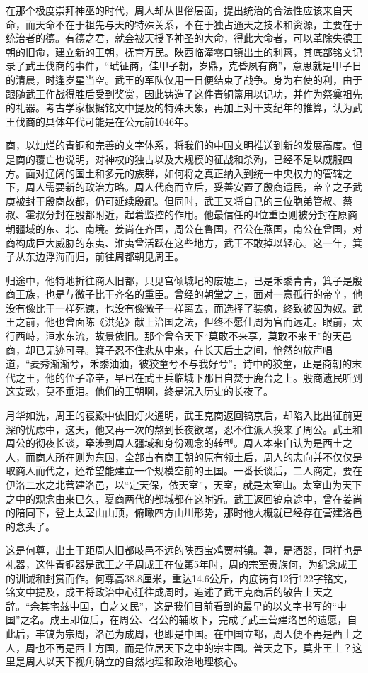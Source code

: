 在那个极度崇拜神巫的时代，周人却从世俗层面，提出统治的合法性应该来自天命，而天命不在于祖先与天的特殊关系，不在于独占通天之技术和资源，主要在于统治者的德。有德之君，就会被天授予神圣的大命，得此大命者，可以革除失德王朝的旧命，建立新的王朝，抚育万民。陕西临潼零口镇出土的利簋，其底部铭文记录了武王伐商的事件，“珷征商，佳甲子朝，岁鼎，克昏夙有商”，意思就是甲子日的清晨，时逢岁星当空。武王的军队仅用一日便结束了战争。身为右使的利，由于跟随武王作战得胜后受到奖赏，因此铸造了这件青铜簋用以记功，并作为祭奠祖先的礼器。考古学家根据铭文中提及的特殊天象，再加上对干支纪年的推算，认为武王伐商的具体年代可能是在公元前1046年。

商，以灿烂的青铜和完善的文字体系，将我们的中国文明推送到新的发展高度。但是商的覆亡也说明，对神权的独占以及大规模的征战和杀殉，已经不足以威服四方。面对辽阔的国土和多元的族群，如何将之真正纳入到统一中央权力的管辖之下，周人需要新的政治方略。周人代商而立后，妥善安置了殷商遗民，帝辛之子武庚被封于殷商故都，仍可延续殷祀。但同时，武王又将自己的三位胞弟管叔、蔡叔、霍叔分封在殷都附近，起着监控的作用。他最信任的4位重臣则被分封在原商朝疆域的东、北、南境。姜尚在齐国，周公在鲁国，召公在燕国，南公在曾国，对商构成巨大威胁的东夷、淮夷曾活跃在这些地方，武王不敢掉以轻心。这一年，箕子从东边浮海而归，前往周都朝见周王。

归途中，他特地折往商人旧都，只见宫倾城圮的废墟上，已是禾黍青青，箕子是殷商王族，也是与微子比干齐名的重臣。曾经的朝堂之上，面对一意孤行的帝辛，他没有像比干一样死谏，也没有像微子一样离去，而选择了装疯，终致被囚为奴。武王之前，他也曾面陈《洪范》献上治国之法，但终不愿仕周为官而远走。眼前，太行西峙，洹水东流，故景依旧。那个曾令天下“莫敢不来享，莫敢不来王”的天邑商，却已无迹可寻。箕子忍不住悲从中来，在长天后土之间，怆然的放声唱道，“麦秀渐渐兮，禾黍油油，彼狡童兮不与我好兮”。诗中的狡童，正是商朝的末代之王，他的侄子帝辛，早已在武王兵临城下那日自焚于鹿台之上。殷商遗民听到这支歌，莫不垂泪。他们的王朝啊，终是沉入历史的长夜了。

月华如洗，周王的寝殿中依旧灯火通明，武王克商返回镐京后，却陷入比出征前更深的忧虑中，这天，他又再一次的熬到长夜欲曙，忍不住派人换来了周公。武王和周公的彻夜长谈，牵涉到周人疆域和身份观念的转型。周人本来自认为是西土之人，而商人所在则为东国，全部占有商王朝的原有领土后，周人的志向并不仅仅是取商人而代之，还希望能建立一个规模空前的王国。一番长谈后，二人商定，要在伊洛二水之北营建洛邑，以“定天保，依天室”，天室，就是太室山。太室山为天下之中的观念由来已久，夏商两代的都城都在这附近。武王返回镐京途中，曾在姜尚的陪同下，登上太室山山顶，俯瞰四方山川形势，那时他大概就已经存在营建洛邑的念头了。

这是何尊，出土于距周人旧都岐邑不远的陕西宝鸡贾村镇。尊，是酒器，同样也是礼器，这件青铜器是武王之子周成王在位第5年时，周的宗室贵族何，为纪念成王的训诫和封赏而作。何尊高38.8厘米，重达14.6公斤，内底铸有12行122字铭文，铭文中提及，成王将政治中心迁往成周时，追述了武王克商后的敬告上天之辞。“余其宅兹中国，自之乂民”，这是我们目前看到的最早的以文字书写的“中国”之名。成王即位后，在周公、召公的辅政下，完成了武王营建洛邑的遗愿，自此后，丰镐为宗周，洛邑为成周，也即是中国。在中国立都，周人便不再是西土之人，周也不再是西土方国，而是位居天下之中的宗主国。普天之下，莫非王土？这里是周人以天下视角确立的自然地理和政治地理核心。

